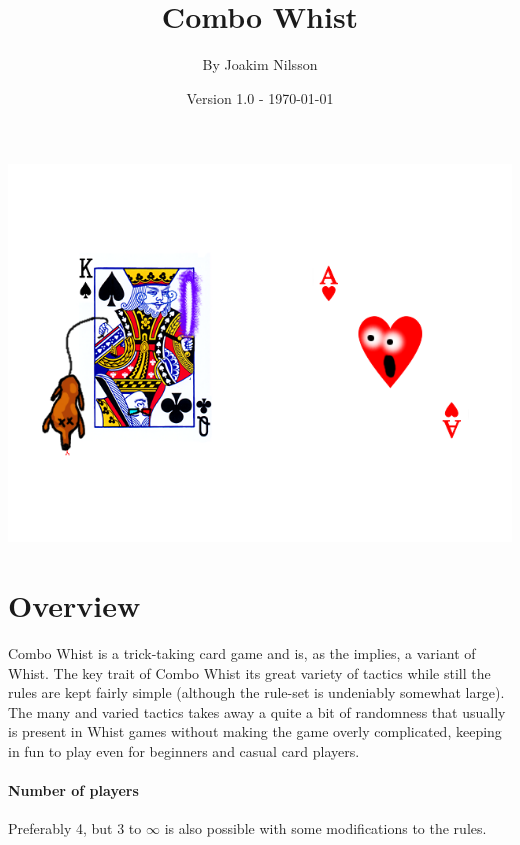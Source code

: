 \documentclass[a4paper, 11pt]{article}
\title{Combo Whist}
\author{By Joakim Nilsson}
\date{Version 1.0 - \today}
\begin{document}
	\maketitle
	
	\begin{center}
		\includegraphics[width = \textwidth]{logo.png}
	\end{center}
	
	\thispagestyle{empty}
	\pagebreak
	
	\setcounter{tocdepth}{3}
	\tableofcontents
	\thispagestyle{empty}
	\pagebreak
	
	\section{Overview}
		
		Combo Whist is a trick-taking card game and is, as the implies, a variant of Whist. The key trait of Combo Whist its great variety of tactics while still the rules are kept fairly simple (although the rule-set is undeniably somewhat large). The many and varied tactics takes away a quite a bit of randomness that usually is present in Whist games without making the game overly complicated, keeping in fun to play even for beginners and casual card players.
		
		\paragraph{Number of players}
		Preferably 4, but 3 to $\infty$ is also possible with some modifications to the rules.
		
\end{document}

